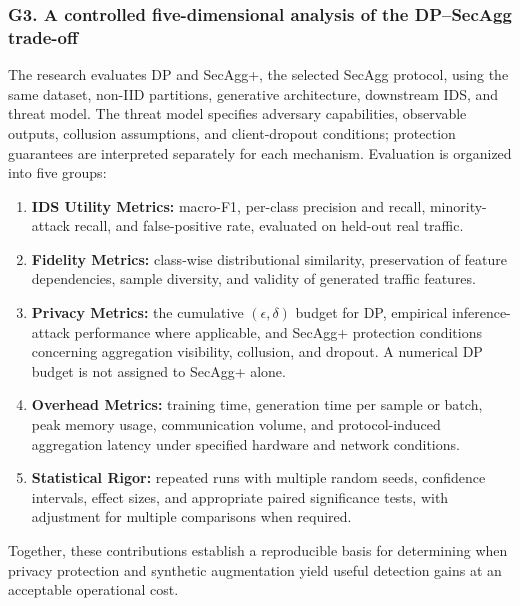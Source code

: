 \subsubsection*{G3. A controlled five-dimensional analysis of the DP--SecAgg trade-off}
The research evaluates DP and SecAgg+, the selected SecAgg protocol, using the same dataset, non-IID partitions, generative architecture, downstream IDS, and threat model. The threat model specifies adversary capabilities, observable outputs, collusion assumptions, and client-dropout conditions; protection guarantees are interpreted separately for each mechanism. Evaluation is organized into five groups:
\begin{enumerate}
    \item \textbf{IDS Utility Metrics:} macro-F1, per-class precision and recall, minority-attack recall, and false-positive rate, evaluated on held-out real traffic.
    \item \textbf{Fidelity Metrics:} class-wise distributional similarity, preservation of feature dependencies, sample diversity, and validity of generated traffic features.
    \item \textbf{Privacy Metrics:} the cumulative $(\epsilon, \delta)$ budget for DP, empirical inference-attack performance where applicable, and SecAgg+ protection conditions concerning aggregation visibility, collusion, and dropout. A numerical DP budget is not assigned to SecAgg+ alone.
    \item \textbf{Overhead Metrics:} training time, generation time per sample or batch, peak memory usage, communication volume, and protocol-induced aggregation latency under specified hardware and network conditions.
    \item \textbf{Statistical Rigor:} repeated runs with multiple random seeds, confidence intervals, effect sizes, and appropriate paired significance tests, with adjustment for multiple comparisons when required.
\end{enumerate}

Together, these contributions establish a reproducible basis for determining when privacy protection and synthetic augmentation yield useful detection gains at an acceptable operational cost.


